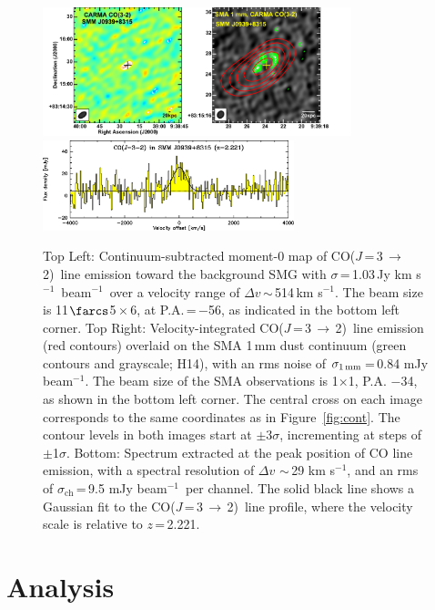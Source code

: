 \documentclass[twocolumn,apj,numberedappendix]{emulateapj}
\newcommand{\CO}{\mbox{CO($J$\,=\,3\,$\rightarrow$\,2) }}
\newcommand{\pmOne}{\mbox{$^{-1}$}}
\begin{document}
\begin{figure}[tbph]
\centering
\includegraphics[width=0.8\textwidth]{Figure/LinePanel.pdf}
\includegraphics[width=0.65\textwidth]{Figure/smmj0939-co32_spec.eps}
\caption{Top Left: Continuum-subtracted moment-0 map of \CO line emission toward
the background SMG with $\sigma$\,=\,1.03\,Jy\,\,km\,\,s\pmOne\ beam\pmOne\ over a velocity range of $\Delta v$\,$\sim$\,514\,km\,\,s\pmOne. The beam size is 11$\farcs$5\,$\times$\,6, at P.A.\,=\,$-$56\degr, as indicated in the bottom left corner.
Top Right: Velocity-integrated \CO line emission (red contours) overlaid on the SMA 1\,mm dust continuum (green contours and grayscale; H14), with an rms noise of $\sigma_\textrm{1\,mm}$\,=\,0.84 mJy beam\pmOne. The beam size of the SMA observations is 1$ \times $1, P.A. $-$34\degr, as shown
in the bottom left corner.
The central cross on each image corresponds to the same coordinates as in Figure~\ref{fig:cont}. The contour levels 
in both images
start at $\pm$3$\sigma$, incrementing at
steps of $\pm$1$\sigma$.
Bottom:
Spectrum extracted at the peak position of CO line emission, with a spectral resolution of $\Delta v$ $\sim$\,29 km\,\,s\pmOne, and an rms of $\sigma_\textrm{ch}$\,=\,9.5 mJy beam\pmOne\ per channel. The
solid black line shows a Gaussian fit to the \CO line profile, where the velocity scale is relative to $z$\,=\,2.221.
\label{fig:mom0}}
\end{figure}


\section{Analysis}
\end{document}
